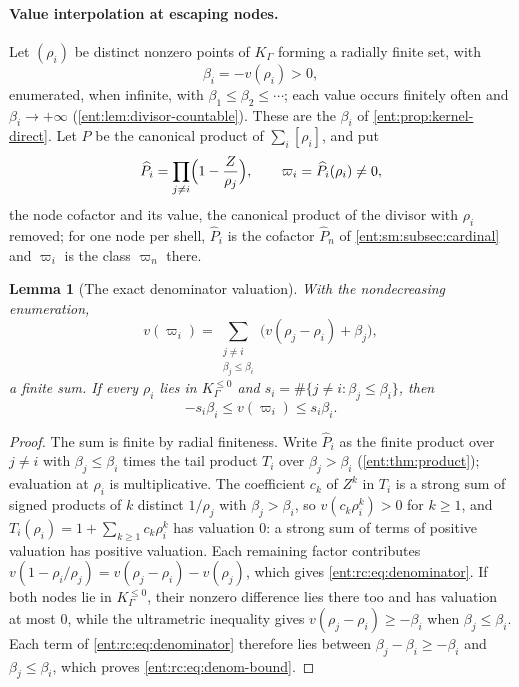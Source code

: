 \documentclass[11pt]{article}
\theoremstyle{plain}
\newtheorem{lemma}[lemma]{Lemma}
\theoremstyle{plain}
\theoremstyle{plain}
\theoremstyle{definition}
\theoremstyle{definition}
\theoremstyle{definition}
\theoremstyle{definition}
\theoremstyle{remark}
\newcommand{\K}{K_\Gamma}\newcommand{\KD}{K_\Delta}
\newcommand{\Kle}{K_\Gamma^{\le0}}\DeclareMathOperator{\Jac}{Jac}
\begin{document}
\paragraph{Value interpolation at escaping nodes.}
Let $(\rho_i)$ be distinct nonzero points of $\K$ forming a radially finite
set, with
\begin{equation}\label{ent:rc:eq:nodes}
 \beta_i=-v(\rho_i)>0 ,
\end{equation}
enumerated, when infinite, with $\beta_1\le\beta_2\le\cdots$; each value
occurs finitely often and $\beta_i\to+\infty$ (\cref{ent:lem:divisor-countable}).
These are the $\beta_i$ of \cref{ent:prop:kernel-direct}. Let $P$ be the
canonical product of $\sum_i[\rho_i]$, and put
\begin{equation}\label{ent:rc:eq:cofactor}
 \widehat P_i=\prod_{j\ne i}\Bigl(1-\frac Z{\rho_j}\Bigr),\qquad
 \varpi_i=\widehat P_i(\rho_i)\ne0 ,
\end{equation}
the node cofactor and its value, the canonical product of the divisor with
$\rho_i$ removed; for one node per shell, $\widehat P_i$ is the cofactor
$\widehat P_n$ of \cref{ent:sm:subsec:cardinal} and $\varpi_i$ is the class
$\varpi_n$ there.

\begin{lemma}[The exact denominator valuation]\label{ent:rc:lem:denominator}
With the nondecreasing enumeration,
\begin{equation}\label{ent:rc:eq:denominator}
 v(\varpi_i)=\sum_{\substack{j\ne i\\ \beta_j\le\beta_i}}
 \bigl(v(\rho_j-\rho_i)+\beta_j\bigr),
\end{equation}
a finite sum. If every $\rho_i$ lies in $\Kle$ and
$s_i=\#\{j\ne i:\beta_j\le\beta_i\}$, then
\begin{equation}\label{ent:rc:eq:denom-bound}
 -s_i\beta_i\le v(\varpi_i)\le s_i\beta_i .
\end{equation}
\end{lemma}
\begin{proof}
The sum is finite by radial finiteness. Write $\widehat P_i$ as the finite
product over $j\ne i$ with $\beta_j\le\beta_i$ times the tail product $T_i$
over $\beta_j>\beta_i$ (\cref{ent:thm:product}); evaluation at $\rho_i$ is
multiplicative. The coefficient $c_k$ of $Z^k$ in $T_i$ is a strong sum of
signed products of $k$ distinct $1/\rho_j$ with $\beta_j>\beta_i$, so
$v(c_k\rho_i^k)>0$ for $k\ge1$, and $T_i(\rho_i)=1+\sum_{k\ge1}c_k\rho_i^k$
has valuation $0$: a strong sum of terms of positive valuation has positive
valuation. Each remaining factor
contributes $v(1-\rho_i/\rho_j)=v(\rho_j-\rho_i)-v(\rho_j)$, which gives
\eqref{ent:rc:eq:denominator}. If both nodes lie in $\Kle$, their nonzero
difference lies there too and has valuation at most $0$, while the
ultrametric inequality gives $v(\rho_j-\rho_i)\ge-\beta_i$ when
$\beta_j\le\beta_i$. Each term of \eqref{ent:rc:eq:denominator} therefore lies
between $\beta_j-\beta_i\ge-\beta_i$ and $\beta_j\le\beta_i$, which proves
\eqref{ent:rc:eq:denom-bound}.
\end{proof}
\end{document}
